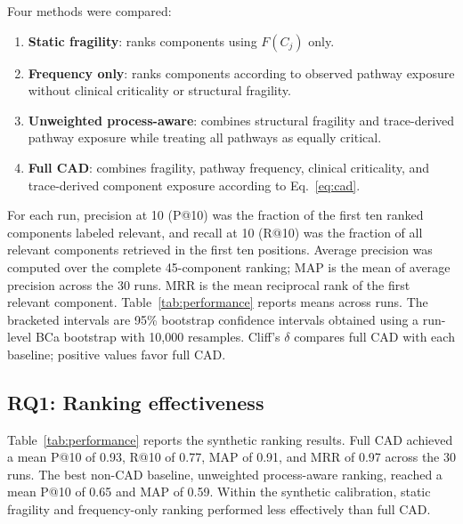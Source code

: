 \documentclass[english,preprint]{elsarticle}
\newcommand{\CAD}{\textsc{CAD}\xspace}
\begin{document}
Four methods were compared:
\begin{enumerate}
  \item \textbf{Static fragility}: ranks components using $F(C_j)$ only.
  \item \textbf{Frequency only}: ranks components according to observed pathway exposure without clinical criticality or structural fragility.
  \item \textbf{Unweighted process-aware}: combines structural fragility and trace-derived pathway exposure while treating all pathways as equally critical.
  \item \textbf{Full \CAD}: combines fragility, pathway frequency, clinical criticality, and trace-derived component exposure according to Eq.~\eqref{eq:cad}.
\end{enumerate}

For each run, precision at 10 (P@10) was the fraction of the first ten ranked components labeled relevant, and recall at 10 (R@10) was the fraction of all relevant components retrieved in the first ten positions. Average precision was computed over the complete 45-component ranking; MAP is the mean of average precision across the 30 runs. MRR is the mean reciprocal rank of the first relevant component. Table~\ref{tab:performance} reports means across runs. The bracketed intervals are 95\% bootstrap confidence intervals obtained using a run-level BCa bootstrap with 10,000 resamples. Cliff's $\delta$ compares full \CAD with each baseline; positive values favor full \CAD \cite{Efron1994Bootstrap,Cliff1993}.

\subsection{RQ1: Ranking effectiveness}

Table~\ref{tab:performance} reports the synthetic ranking results. Full \CAD achieved a mean P@10 of 0.93, R@10 of 0.77, MAP of 0.91, and MRR of 0.97 across the 30 runs. The best non-\CAD baseline, unweighted process-aware ranking, reached a mean P@10 of 0.65 and MAP of 0.59. Within the synthetic calibration, static fragility and frequency-only ranking performed less effectively than full \CAD.
\end{document}
